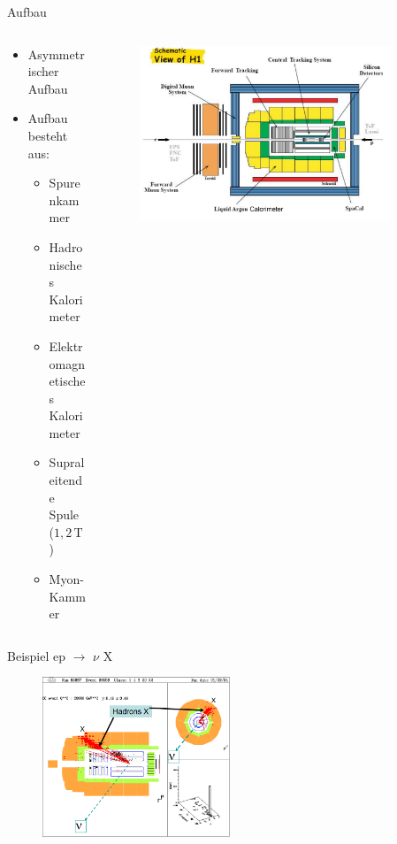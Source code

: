 \documentclass[aspectratio=1610, 9pt]{beamer}
\begin{document}
\begin{frame}{Aufbau}
  \begin{columns}
    \begin{column}{0.4\textwidth}
      \begin{itemize}
        \item{Asymmetrischer Aufbau}
        \item{Aufbau besteht aus:}
        \begin{itemize}
          \item{Spurenkammer}
          \item{Hadronisches Kalorimeter}
          \item{Elektromagnetisches Kalorimeter}
          \item{Supraleitende Spule ($1,2\,\mathrm{T} $)}
          \item{Myon-Kammer}
        \end{itemize}
      \end{itemize}
    \end{column}

    \begin{column}{0.6\textwidth}
      \begin{figure}
        \centering
        \includegraphics[width=0.9\textwidth]{images/H1.png}
      \end{figure}
    \end{column}
  \end{columns}
\end{frame}

\begin{frame}{Beispiel}
  ep $\rightarrow$ $\nu$ X
  \begin{figure}
    \centering
    \includegraphics[width=0.50\textwidth]{images/ep-vx.png}
  \end{figure}
\end{frame}
\end{document}
